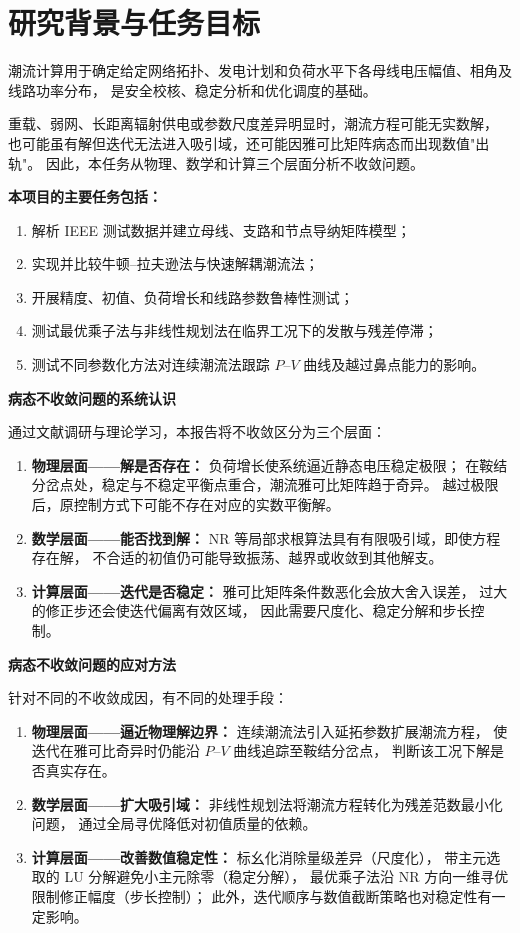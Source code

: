\section{研究背景与任务目标}
\label{sec:introduction}

潮流计算用于确定给定网络拓扑、发电计划和负荷水平下各母线电压幅值、相角及线路功率分布，
是安全校核、稳定分析和优化调度的基础。

重载、弱网、长距离辐射供电或参数尺度差异明显时，潮流方程可能无实数解，
也可能虽有解但迭代无法进入吸引域，还可能因雅可比矩阵病态而出现数值"出轨"。
因此，本任务从物理、数学和计算三个层面分析不收敛问题。

\textbf{本项目的主要任务包括：}
\begin{enumerate}
  \item 解析 IEEE 测试数据并建立母线、支路和节点导纳矩阵模型；
  \item 实现并比较牛顿--拉夫逊法与快速解耦潮流法；
  \item 开展精度、初值、负荷增长和线路参数鲁棒性测试；
  \item 测试最优乘子法与非线性规划法在临界工况下的发散与残差停滞；
  \item 测试不同参数化方法对连续潮流法跟踪 $P$--$V$ 曲线及越过鼻点能力的影响。
\end{enumerate}

\textbf{病态不收敛问题的系统认识}

通过文献调研与理论学习，本报告将不收敛区分为三个层面：

\begin{enumerate}
  \item \textbf{物理层面——解是否存在：}
  负荷增长使系统逼近静态电压稳定极限；
  在鞍结分岔点处，稳定与不稳定平衡点重合，潮流雅可比矩阵趋于奇异。
  越过极限后，原控制方式下可能不存在对应的实数平衡解。
  \item \textbf{数学层面——能否找到解：}
  NR 等局部求根算法具有有限吸引域，即使方程存在解，
  不合适的初值仍可能导致振荡、越界或收敛到其他解支。
  \item \textbf{计算层面——迭代是否稳定：}
  雅可比矩阵条件数恶化会放大舍入误差，
  过大的修正步还会使迭代偏离有效区域，
  因此需要尺度化、稳定分解和步长控制。
\end{enumerate}

\textbf{病态不收敛问题的应对方法}

针对不同的不收敛成因，有不同的处理手段：

\begin{enumerate}
  \item \textbf{物理层面——逼近物理解边界：}
  连续潮流法引入延拓参数扩展潮流方程，
  使迭代在雅可比奇异时仍能沿 $P$--$V$ 曲线追踪至鞍结分岔点，
  判断该工况下解是否真实存在。
  \item \textbf{数学层面——扩大吸引域：}
  非线性规划法将潮流方程转化为残差范数最小化问题，
  通过全局寻优降低对初值质量的依赖。
  \item \textbf{计算层面——改善数值稳定性：}
  标幺化消除量级差异（尺度化），
  带主元选取的 LU 分解避免小主元除零（稳定分解），
  最优乘子法沿 NR 方向一维寻优限制修正幅度（步长控制）；
  此外，迭代顺序与数值截断策略也对稳定性有一定影响。
\end{enumerate}
